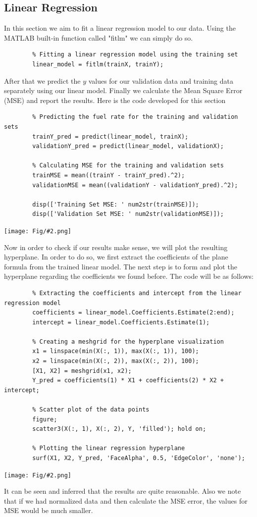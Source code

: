 \documentclass[]{article}
\newcommand{\pict}[2]{\begin{center}
		\texttt{[image: Fig/\#2.png]}
\end{center}}
\begin{document}
	\subsection{Linear Regression}
	In this section we aim to fit a linear regression model to our data. Using the MATLAB built-in function called "fitlm" we can simply do so.
	\begin{lstlisting}
		% Fitting a linear regression model using the training set
		linear_model = fitlm(trainX, trainY);
	\end{lstlisting}
	After that we predict the $y$ values for our validation data and training data separately using our linear model. Finally we calculate the Mean Square Error (MSE) and report the results. Here is the code developed for this section
	\begin{lstlisting}
		% Predicting the fuel rate for the training and validation sets
		trainY_pred = predict(linear_model, trainX);
		validationY_pred = predict(linear_model, validationX);
		
		% Calculating MSE for the training and validation sets
		trainMSE = mean((trainY - trainY_pred).^2);
		validationMSE = mean((validationY - validationY_pred).^2);
		
		disp(['Training Set MSE: ' num2str(trainMSE)]);
		disp(['Validation Set MSE: ' num2str(validationMSE)]);
	\end{lstlisting}
	\pict{0.4}{F2}
	Now in order to check if our results make sense, we will plot the resulting hyperplane. In order to do so, we first extract the coefficients of the plane formula from the trained linear model. The next step is to form and plot the hyperplane regarding the coefficients we found before. The code will be as follows:
	\begin{lstlisting}
		% Extracting the coefficients and intercept from the linear regression model
		coefficients = linear_model.Coefficients.Estimate(2:end);
		intercept = linear_model.Coefficients.Estimate(1);
		
		% Creating a meshgrid for the hyperplane visualization
		x1 = linspace(min(X(:, 1)), max(X(:, 1)), 100);
		x2 = linspace(min(X(:, 2)), max(X(:, 2)), 100);
		[X1, X2] = meshgrid(x1, x2);
		Y_pred = coefficients(1) * X1 + coefficients(2) * X2 + intercept;
		
		% Scatter plot of the data points
		figure;
		scatter3(X(:, 1), X(:, 2), Y, 'filled'); hold on;
		
		% Plotting the linear regression hyperplane
		surf(X1, X2, Y_pred, 'FaceAlpha', 0.5, 'EdgeColor', 'none');
	\end{lstlisting} 
	\pict{0.9}{F3}
	It can be seen and inferred that the results are quite reasonable. Also we note that if we had normalized data and then calculate the MSE error, the values for MSE would be much smaller.
	
\end{document}
